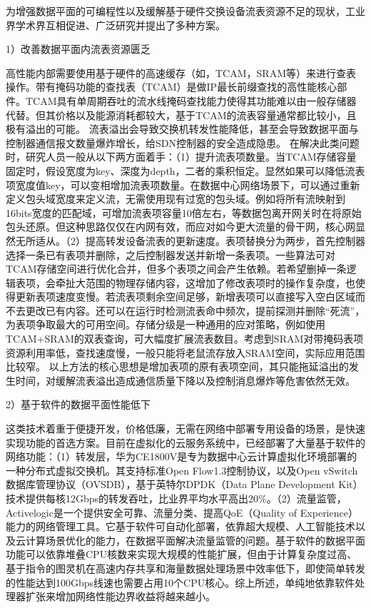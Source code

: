 \label{chap113}

为增强数据平面的可编程性以及缓解基于硬件交换设备流表资源不足的现状，工业界学术界互相促进、广泛研究并提出了多种方案。

1）改善数据平面内流表资源匮乏

高性能内部需要使用基于硬件的高速缓存（如，TCAM，SRAM等）来进行查表操作。带有掩码功能的查找表（TCAM）是做IP最长前缀查找的高性能核心部件。TCAM具有单周期吞吐的流水线掩码查找能力使得其功能难以由一般存储器代替。但其价格以及能源消耗都较大，基于TCAM的流表容量通常都比较小，且极有溢出的可能。
流表溢出会导致交换机转发性能降低，甚至会导致数据平面与控制器通信报文数量爆炸增长，给SDN控制器的安全造成隐患。
在解决此类问题时，研究人员一般从以下两方面着手：（1）提升流表项数量。当TCAM存储容量固定时，假设宽度为key、深度为depth，二者的乘积恒定。显然如果可以降低流表项宽度值key，可以变相增加流表项数量。在数据中心网络场景下，可以通过重新定义包头域宽度来定义流，无需使用现有过宽的包头域。例如将所有流映射到16bits宽度的匹配域，可增加流表项容量10倍左右，等数据包离开网关时在将原始包头还原。但这种思路仅仅在内网有效，而应对如今更大流量的骨干网，核心网显然无所适从。（2）提高转发设备流表的更新速度。表项替换分为两步，首先控制器选择一条已有表项并删除，之后控制器发送并新增一条表项。一些算法可对TCAM存储空间进行优化合并，但多个表项之间会产生依赖。若希望删掉一条逻辑表项，会牵扯大范围的物理存储内容，这增加了修改表项时的操作复杂度，也使得更新表项速度变慢。若流表项剩余空间足够，新增表项可以直接写入空白区域而不去更改已有内容。还可以在运行时检测流表命中频次，提前探测并删除“死流”，为表项争取最大的可用空间。存储分级是一种通用的应对策略，例如使用TCAM+SRAM的双表查询，可大幅度扩展流表数目。考虑到SRAM对带掩码表项资源利用率低，查找速度慢，一般只能将老鼠流存放入SRAM空间，实际应用范围比较窄。
以上方法的核心思想是增加表项的原有表项空间，其只能拖延溢出的发生时间，对缓解流表溢出造成通信质量下降以及控制消息爆炸等危害依然无效。

2）基于软件的数据平面性能低下

这类技术着重于便捷开发，价格低廉，无需在网络中部署专用设备的场景，是快速实现功能的首选方案。目前在虚拟化的云服务系统中，已经部署了大量基于软件的网络功能：（1）转发层，华为CE1800V是专为数据中心云计算虚拟化环境部署的一种分布式虚拟交换机。其支持标准Open Flow1.3控制协议，以及Open vSwitch 数据库管理协议（OVSDB），基于英特尔DPDK（Data Plane Development Kit）技术提供每核12Gbps的转发吞吐，比业界平均水平高出20\%。（2）流量监管，Activelogic是一个提供安全可靠、流量分类、提高QoE（Quality of Experience）能力的网络管理工具。它基于软件可自动化部署，依靠超大规模、人工智能技术以及云计算场景优化的能力，在数据平面解决流量监管的问题。基于软件的数据平面功能可以依靠堆叠CPU核数来实现大规模的性能扩展，但由于计算复杂度过高、基于指令的图灵机在高速内存共享和海量数据处理场景中效率低下，即使简单转发的性能达到100Gbps线速也需要占用10个CPU核心。综上所述，单纯地依靠软件处理器扩张来增加网络性能边界收益将越来越小。

